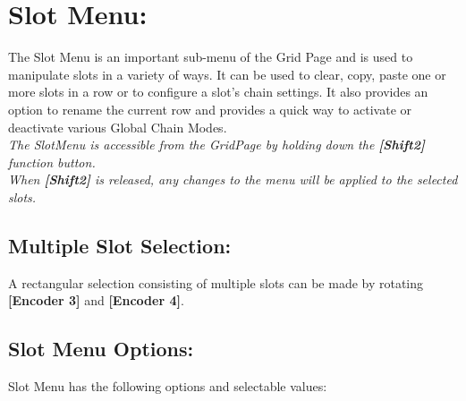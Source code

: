 \chapter{Slot Menu:}

The Slot Menu is an important sub-menu of the Grid Page and is used to manipulate slots in a variety of ways. It can be used to clear, copy, paste one or more slots in a row or to configure a slot's chain settings. It also provides an option to rename the current row and provides a quick way to activate or deactivate various Global Chain Modes.
\\
\textit{The SlotMenu is accessible from the GridPage by holding down the  \textbf{[Shift2]} function button.\\
When \textbf{[Shift2]} is released, any changes to the menu will be applied to the selected slots. }
\\
\section{Multiple Slot Selection:}
A rectangular selection consisting of multiple slots can be made by rotating \textbf{[Encoder 3]} and \textbf{[Encoder 4]}.


\section{Slot Menu Options:}
Slot Menu has the following options and selectable values:

